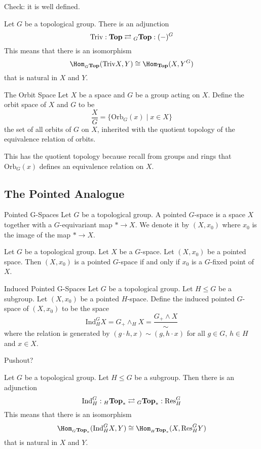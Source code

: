\documentclass[a4paper]{article}
\begin{document}
Check: it is well defined.

\begin{prp}{}{} Let $G$ be a topological group. There is an adjunction $$\text{Triv}:\bold{Top}\rightleftarrows{_G\bold{Top}}:(-)^G$$ This means that there is an isomorphism $$\Hom_{_G\bold{Top}}(\text{Triv}X,Y)\cong\Hom_\bold{Top}(X,Y^G)$$ that is natural in $X$ and $Y$. 
\end{prp}

\begin{defn}{The Orbit Space}{} Let $X$ be a space and $G$ be a group acting on $X$. Define the orbit space of $X$ and $G$ to be $$\frac{X}{G}=\{\text{Orb}_G(x)\;|\; x\in X\}$$ the set of all orbits of $G$ on $X$, inherited with the quotient topology of the equivalence relation of orbits. 
\end{defn}

This has the quotient topology because recall from groups and rings that $\text{Orb}_G(x)$ defines an equivalence relation on $X$. 

\subsection{The Pointed Analogue}
\begin{defn}{Pointed G-Spaces}{} Let $G$ be a topological group. A pointed $G$-space is a space $X$ together with a $G$-equivariant map $\ast\to X$. We denote it by $(X,x_0)$ where $x_0$ is the image of the map $\ast\to X$. 
\end{defn}

\begin{lmm}{}{} Let $G$ be a topological group. Let $X$ be a $G$-space. Let $(X,x_0)$ be a pointed space. Then $(X,x_0)$ is a pointed $G$-space if and only if $x_0$ is a $G$-fixed point of $X$. 
\end{lmm}

\begin{defn}{Induced Pointed G-Spaces}{} Let $G$ be a topological group. Let $H\leq G$ be a subgroup. Let $(X,x_0)$ be a pointed $H$-space. Define the induced pointed $G$-space of $(X,x_0)$ to be the space $$\text{Ind}_H^GX=G_+\wedge_HX=\frac{G_+\wedge X}{\sim}$$ where the relation is generated by $(g\cdot h,x)\sim(g,h\cdot x)$ for all $g\in G$, $h\in H$ and $x\in X$. 
\end{defn}

Pushout?

\begin{prp}{}{} Let $G$ be a topological group. Let $H\leq G$ be a subgroup. Then there is an adjunction $$\text{Ind}_H^G:{_H\bold{Top}_\ast}\rightleftarrows{_G\bold{Top}_\ast}:\text{Res}_H^G$$ This means that there is an isomorphism $$\Hom_{_G\bold{Top}_\ast}(\text{Ind}_H^GX,Y)\cong\Hom_{_H\bold{Top}_\ast}(X,\text{Res}_H^GY)$$ that is natural in $X$ and $Y$. 
\end{prp}
\end{document}
